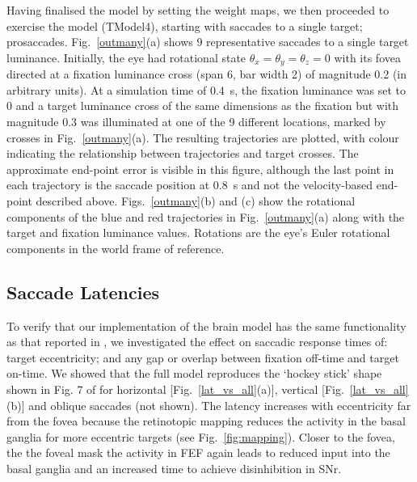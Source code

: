 \documentclass{frontiersSCNS}
\begin{document}
Having finalised the model by setting the weight maps, we then
proceeded to exercise the model (TModel4), starting with saccades to a
single target; prosaccades. Fig.~\ref{outmany}(a) shows 9
representative saccades to a single target luminance. Initially, the
eye had rotational state $\theta_x=\theta_y=\theta_z=0$ with its fovea
directed at a fixation luminance cross (span 6\dg, bar width 2\dg) of
magnitude 0.2 (in arbitrary units). At a simulation time of 0.4~s, the
fixation luminance was set to 0 and a target luminance cross of the
same dimensions as the fixation but with magnitude 0.3 was illuminated
at one of the 9 different locations, marked by crosses in
Fig.~\ref{outmany}(a).  The resulting trajectories are plotted, with
colour indicating the relationship between trajectories and target
crosses. The approximate end-point error is visible in this figure,
although the last point in each trajectory is the saccade position at
0.8~s and not the velocity-based end-point described
above. Figs.~\ref{outmany}(b) and (c) show the rotational components
of the blue and red trajectories in Fig.~\ref{outmany}(a) along with
the target and fixation luminance values. Rotations are the eye's
Euler rotational components in the world frame of reference.


\subsection{Saccade Latencies} \label{sec:results:latencies}

To verify that our implementation of the brain model has the same
functionality as that reported in \cite{cope_basal_2017}, we
investigated the effect on saccadic response times of: target
eccentricity; and any gap or overlap between fixation off-time and
target on-time. We showed that the full model reproduces the `hockey
stick' shape shown in Fig. 7 of \cite{cope_basal_2017} for horizontal
[Fig.~\ref{lat_vs_all}(a)], vertical [Fig.~\ref{lat_vs_all}(b)] and
oblique saccades (not shown). The latency increases with eccentricity
far from the fovea because the retinotopic mapping reduces the
activity in the basal ganglia for more eccentric targets (see
Fig.~\ref{fig:mapping}). Closer to the fovea, the  the
foveal mask  the activity in FEF again leads to reduced input
into the basal ganglia and an increased time to achieve disinhibition
in SNr.
\end{document}
